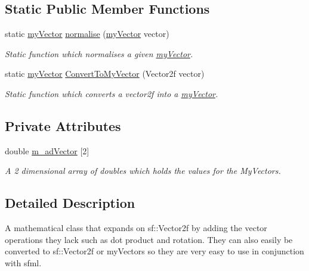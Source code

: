 \subsection*{Static Public Member Functions}
\begin{DoxyCompactItemize}
\item 
static \hyperlink{classmy_vector}{my\+Vector} \hyperlink{classmy_vector_aad23cd26628305a6a0b470a3650c326b}{normalise} (\hyperlink{classmy_vector}{my\+Vector} vector)
\begin{DoxyCompactList}\small\item\em Static function which normalises a given \hyperlink{classmy_vector}{my\+Vector}. \end{DoxyCompactList}\item 
static \hyperlink{classmy_vector}{my\+Vector} \hyperlink{classmy_vector_a19b37337f80ec19c1c70cd4e5d8ade14}{Convert\+To\+My\+Vector} (Vector2f vector)
\begin{DoxyCompactList}\small\item\em Static function which converts a vector2f into a \hyperlink{classmy_vector}{my\+Vector}. \end{DoxyCompactList}\end{DoxyCompactItemize}
\subsection*{Private Attributes}
\begin{DoxyCompactItemize}
\item 
\hypertarget{classmy_vector_acd336d40623a15d9dadf80e889777823}{}double \hyperlink{classmy_vector_acd336d40623a15d9dadf80e889777823}{m\+\_\+ad\+Vector} \mbox{[}2\mbox{]}\label{classmy_vector_acd336d40623a15d9dadf80e889777823}

\begin{DoxyCompactList}\small\item\em A 2 dimensional array of doubles which holds the values for the My\+Vectors. \end{DoxyCompactList}\end{DoxyCompactItemize}


\subsection{Detailed Description}
A mathematical class that expands on sf\+::\+Vector2f by adding the vector operations they lack such as dot product and rotation. They can also easily be converted to sf\+::\+Vector2f or my\+Vectors so they are very easy to use in conjunction with sfml.

